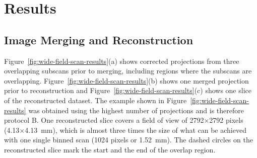 \section{Results}\label{sec:Results}
\subsection{Image Merging and Reconstruction}\label{sec:Image Merging and Reconstruction}
Figure~\ref{fig:wide-field-scan-results}(a) shows corrected projections from three overlapping subscans prior to merging, including regions where the subscans are overlapping. Figure~\ref{fig:wide-field-scan-results}(b) shows one merged projection prior to reconstruction and Figure~\ref{fig:wide-field-scan-results}(c) shows one slice of the reconstructed dataset. The example shown in Figure~\ref{fig:wide-field-scan-results} was obtained using the highest number of projections and is therefore protocol B. One reconstructed slice covers a field of view of 2792$\times$2792 pixels (4.13$\times$\SI{4.13}{\milli\meter}), which is almost three times the size of what can be achieved with one single binned scan (1024 pixels or \SI{1.52}{\milli\meter}). %
The dashed circles on the reconstructed slice mark the start and the end of the overlap region.

